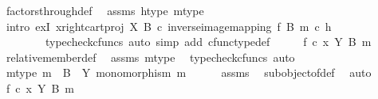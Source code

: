\begin{isabellebody}
\ factors{\isacharunderscore}{\kern0pt}through{\isacharunderscore}{\kern0pt}def\ \isamarkupfalse%
\ assms\ h{\isacharunderscore}{\kern0pt}type\ m{\isacharunderscore}{\kern0pt}type\isanewline
\ \ \ \ \isamarkupfalse%
\ {\isacharparenleft}{\kern0pt}intro\ exI{\isacharbrackleft}{\kern0pt}\ x{\isacharequal}{\kern0pt}{\isachardoublequoteopen}right{\isacharunderscore}{\kern0pt}cart{\isacharunderscore}{\kern0pt}proj\ X\ B\ {\isasymcirc}\isactrlsub c\ inverse{\isacharunderscore}{\kern0pt}image{\isacharunderscore}{\kern0pt}mapping\ f\ B\ m\ {\isasymcirc}\isactrlsub c\ h{\isachardoublequoteclose}{\isacharbrackright}{\kern0pt}{\isacharcomma}{\kern0pt}\isanewline
\ \ \ \ \ \ \ \ typecheck{\isacharunderscore}{\kern0pt}cfuncs{\isacharcomma}{\kern0pt}\ auto\ simp\ add{\isacharcolon}{\kern0pt}\ cfunc{\isacharunderscore}{\kern0pt}type{\isacharunderscore}{\kern0pt}def{\isacharparenright}{\kern0pt}\isanewline
\ \ \isamarkupfalse%
\ \isamarkupfalse%
\ {\isachardoublequoteopen}f\ {\isasymcirc}\isactrlsub c\ x\ {\isasymin}\isactrlbsub Y\isactrlesub \ {\isacharparenleft}{\kern0pt}B{\isacharcomma}{\kern0pt}\ m{\isacharparenright}{\kern0pt}{\isachardoublequoteclose}\isanewline
\ \ \ \ \isamarkupfalse%
\ relative{\isacharunderscore}{\kern0pt}member{\isacharunderscore}{\kern0pt}def{}\ \isamarkupfalse%
\ assms\ m{\isacharunderscore}{\kern0pt}type\ \isamarkupfalse%
\ {\isacharparenleft}{\kern0pt}typecheck{\isacharunderscore}{\kern0pt}cfuncs{\isacharcomma}{\kern0pt}\ auto{\isacharparenright}{\kern0pt}\isanewline
{}\isamarkupfalse%
\isanewline
\ \ \isamarkupfalse%
\ m{\isacharunderscore}{\kern0pt}type{\isacharcolon}{\kern0pt}\ {\isachardoublequoteopen}m\ {\isacharcolon}{\kern0pt}\ B\ {\isasymrightarrow}\ Y{\isachardoublequoteclose}\ {\isachardoublequoteopen}monomorphism\ m{\isachardoublequoteclose}\isanewline
\ \ \ \ \isamarkupfalse%
\ assms{\isacharparenleft}{\kern0pt}{}{\isacharparenright}{\kern0pt}\ \isamarkupfalse%
\ subobject{\isacharunderscore}{\kern0pt}of{\isacharunderscore}{\kern0pt}def{}\ \isamarkupfalse%
\ auto\isanewline
\isanewline
\ \ \isamarkupfalse%
\ {\isachardoublequoteopen}f\ {\isasymcirc}\isactrlsub c\ x\ {\isasymin}\isactrlbsub Y\isactrlesub \ {\isacharparenleft}{\kern0pt}B{\isacharcomma}{\kern0pt}\ m{\isacharparenright}{\kern0pt}{\isachardoublequoteclose}\isanewline
\ \ \isamarkupfalse%

\end{isabellebody}
